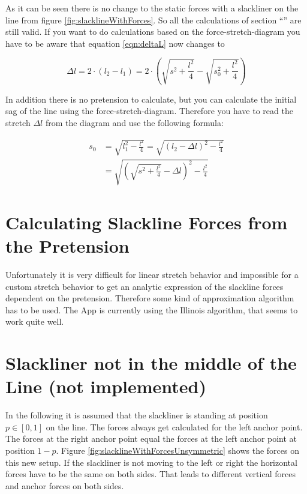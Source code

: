 As it can be seen there is no change to the static forces with a slackliner on the line from figure \ref{fig:slacklineWithForces}. So all the calculations of section ``'' are still valid. If you want to do calculations based on the force-stretch-diagram you have to be aware that equation \ref{eqn:deltaL} now changes to

\begin{equation}
	\Delta l = 2\cdot (l_2 - l_1) = 2\cdot \left( \sqrt{s^2+\frac{l^2}{4}} - \sqrt{s_0^2+\frac{l^2}{4}}\right)
	\label{eqn:deltaLRodeo}
\end{equation}

In addition there is no pretension to calculate, but you can calculate the initial sag of the line using the force-stretch-diagram. Therefore you have to read the stretch $\Delta l$ from the diagram and use the following formula:

\begin{align}
	s_0 &= \sqrt{l_1^2 - \frac{l^2}{4}} = \sqrt{\left(l_2-\Delta l\right)^2 - \frac{l^2}{4}} \\
	&= \sqrt{\left( \sqrt{s^2 + \frac{l^2}{4}}  -\Delta l\right)^2 - \frac{l^2}{4}}
\end{align}

\section{Calculating Slackline Forces from the Pretension}

Unfortunately it is very difficult for linear stretch behavior and impossible for a custom stretch behavior to get an analytic expression of the slackline forces dependent on the pretension. Therefore some kind of approximation algorithm has to be used. The App is currently using the Illinois algorithm, that seems to work quite well.

\section{Slackliner not in the middle of the Line (not implemented)}

In the following it is assumed that the slackliner is standing at position $p \in [0,1]$ on the line. The forces always get calculated for the left anchor point. The forces at the right anchor point equal the forces at the left anchor point at position $1-p$. Figure \ref{fig:slacklineWithForcesUnsymmetric} shows the forces on this new setup. If the slackliner is not moving to the left or right the horizontal forces have to be the same on both sides. That leads to different vertical forces and anchor forces on both sides.

